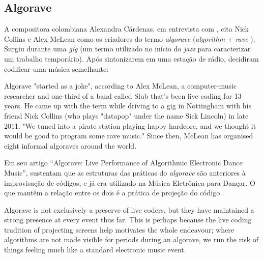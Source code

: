\subsection{Algorave}\label{sec:algorave}

A compositora colombiana Alexandra Cárdenas, em entrevista com , cita Nick Collins e Alex McLean como os criadores do termo \emph{algorave} (\emph{algorithm} $+$ \emph{rave} ). Surgiu durante uma \emph{gig} (um termo utilizado no início do \emph{jazz} para caracterizar um trabalho temporário). Após sintonizarem em uma estação de rádio, decidiram codificar uma música semelhante:

\begin{citacao}
{
Algorave "started as a joke", according to Alex McLean, a computer-music researcher and one-third of a band called Slub that's been live coding for 13 years. He came up with the term while driving to a gig in Nottingham with his friend Nick Collins (who plays "datapop" under the name Sick Lincoln) in late 2011. "We tuned into a pirate station playing happy hardcore, and we thought it would be good to program some rave music." Since then, McLean has organised eight informal algoraves around the world. 
}
\end{citacao}

Em seu artigo ``Algorave: Live Performance of Algorithmic Electronic Dance Music'',  sustentam que as estruturas das práticas do \emph{algorave} são anteriores à improvisação de códigos, e já era utilizado na Música Eletrônica para Dançar. O que mantêm a relação entre os dois é a prática de projeção do código .

\begin{citacao}
{Algorave is not exclusively a preserve of live coders, but they have maintained a strong presence at every event thus far. This is perhaps because the live coding tradition of projecting screens help motivates the whole endeavour; where algorithms are not made visible for periods during an algorave, we run the risk of things feeling much like a standard electronic music event.}

\end{citacao}

